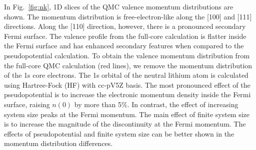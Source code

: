 \documentclass[aps,prb,showpacs,preprintnumbers,amsmath,amssymb,superscriptaddress,twocolumn]{revtex4-1}
\begin{document}
In Fig.~\ref{fig:nk}, 1D slices of the QMC valence momentum distributions are shown. The momentum distribution is free-electron-like along the [100] and [111] directions. Along the [110] direction, however, there is a pronounced secondary Fermi surface. The valence profile from the full-core calculation is flatter inside the Fermi surface and has enhanced secondary features when compared to the pseudopotential calculation. To obtain the valence momentum distribution from the full-core QMC calculation (red lines), we remove the momentum distribution of the 1s core electrons. The 1s orbital of the neutral lithium atom is calculated using Hartree-Fock (HF) with cc-pV5Z basis. The most pronounced effect of the pseudopotential is to increase the electronic momentum density inside the Fermi surface, raising $n(0)$ by more than 5\%. In contrast, the effect of increasing system size peaks at the Fermi momentum. The main effect of finite system size is to increase the magnitude of the discontinuity at the Fermi momentum. The effects of pseudopotential and finite system size can be better shown in the momentum distribution differences.
\end{document}
